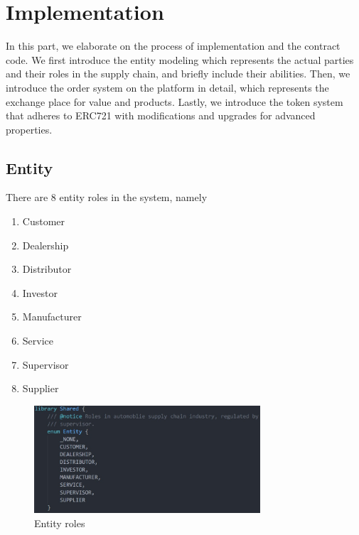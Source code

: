 \documentclass[12pt]{article}
\begin{document}
%

\section{Implementation}
In this part, we elaborate on the process of implementation and the contract code. We first introduce the entity modeling which represents the actual parties and their roles in the supply chain, and briefly include their abilities. Then, we introduce the order system on the platform in detail, which represents the exchange place for value and products. Lastly, we introduce the token system that adheres to ERC721 with modifications and upgrades for advanced properties.

\subsection{Entity}
There are 8 entity roles in the system, namely
\begin{enumerate}[label=\alph*.]
    \item Customer%
    \item Dealership%
    \item Distributor%
    \item Investor%
    \item Manufacturer%
    \item Service%
    \item Supervisor%
    \item Supplier%
\end{enumerate}
\begin{figure}[h]
    \centering
    \includegraphics[width=0.75\textwidth]{entities.jpg}
    \caption{Entity roles}
    \label{fig:entity}
\end{figure}
\end{document}
